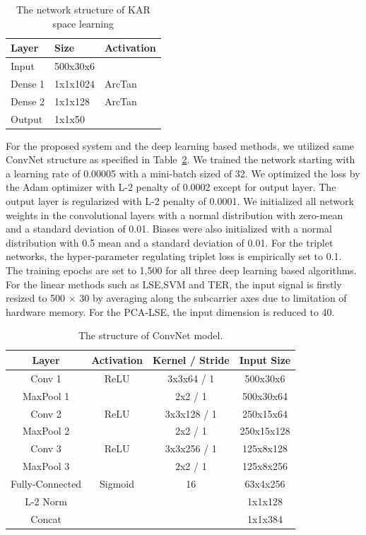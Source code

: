 \documentclass[runningheads]{llncs}
\begin{document}
\begin{table}[]
    \caption{The network structure of KAR space learning}\label{tab2}
    \centering
    \begin{tabular}{|l|l|l|}
    \hline
    Layer   & Size     & Activation \\ \hline
    Input   & 500x30x6 &            \\
    Dense 1 & 1x1x1024 & ArcTan     \\
    Dense 2 & 1x1x128  & ArcTan     \\
    Output  & 1x1x50   &            \\ \hline
    \end{tabular}
\end{table}

For the proposed system and the deep learning based methods, we utilized same ConvNet structure as specified in Table~\ref{tab1}. We trained the network starting with a learning rate of 0.00005 with a mini-batch sized of 32. We optimized the loss by the Adam optimizer with L-2 penalty of 0.0002 except for output layer. The output layer is regularized with L-2 penalty of 0.0001. We initialized all network weights in the convolutional layers with a normal distribution with zero-mean and a standard deviation of 0.01. Biases were also initialized with a normal distribution with 0.5 mean and a standard deviation of 0.01. For the triplet networks, the hyper-parameter regulating triplet loss is empirically set to 0.1. The training epochs are set to 1,500 for all three deep learning based algorithms. For the linear methods such as LSE,SVM and TER, the input signal is firstly resized to 500 $\times$ 30 by averaging along the subcarrier axes due to limitation of hardware memory. For the PCA-LSE, the input dimension is reduced to 40.
 
 \begin{table}[]
    \caption{The structure of ConvNet model.}\label{tab1}
    \centering
    \begin{tabular}{|c|c|c|c|}
    \hline
    Layer     & Activation & Kernel / Stride & Input Size \\ \hline
    Conv 1    & ReLU       & 3x3x64 / 1      & 500x30x6   \\
    MaxPool 1 &            & 2x2 / 1         & 500x30x64  \\
    Conv 2    & ReLU       & 3x3x128 / 1     & 250x15x64 \\
    MaxPool 2 &            & 2x2 / 1         & 250x15x128 \\
    Conv 3    & ReLU       & 3x3x256 / 1     & 125x8x128  \\
    MaxPool 3 &            & 2x2 / 1         & 125x8x256  \\
    Fully-Connected     & Sigmoid    & 16             & 63x4x256   \\
    L-2 Norm  &            &                 & 1x1x128    \\
    Concat    &            &                 & 1x1x384    \\ \hline
    \end{tabular}
\end{table}
\end{document}
